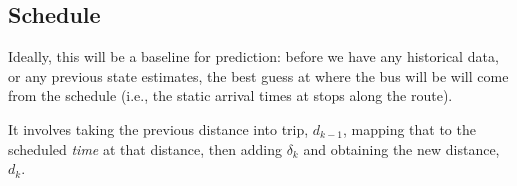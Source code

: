 \documentclass[10pt,a4paper]{article}
\begin{document}
\subsection{Schedule}

Ideally, this will be a baseline for prediction: before we have any historical data,
or any previous state estimates, the best guess at where the bus will be will come from
the schedule (i.e., the static arrival times at stops along the route).

It involves taking the previous distance into trip, $d_{k-1}$, 
mapping that to the scheduled \emph{time} at that distance,
then adding $\delta_k$ and obtaining the new distance, $d_k$.
\end{document}

